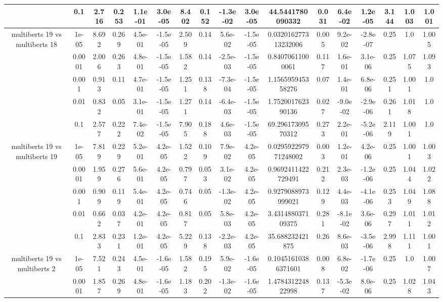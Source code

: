 \begin{tabular}{|c|c|c|c|c|c|c|c|c|c|c|c|c|c|c|c|c|}
 & 0.1 & 2.716 & 0.253 & 1.1e-01 & 3.0e-05 & 8.402 & 0.152 & -1.3e-02 & 3.0e-05 & 44.5441780090332 & 0.031 & 6.4e-02 & 1.2e-05 & 3.144 & 1.003 & 1.001 \\
\hline
\multirow{5}{*}{multiberts 19 vs multiberts 18} & 1e-05 & 8.692 & 0.269 & 4.5e-01 & -1.5e-05 & 2.509 & 0.14 & 5.6e-02 & -1.5e-05 & 0.032016277313232006 & 0.005 & 9.2e-02 & -2.8e-07 & 0.25 & 1.0 & 1.005 \\
 & 0.0001 & 2.006 & 0.263 & 4.8e-01 & -1.5e-05 & 1.582 & 0.14 & -2.5e-03 & -1.5e-05 & 0.84070611000061 & 0.117 & 1.6e-01 & 3.1e-06 & 0.25 & 1.075 & 1.093 \\
 & 0.001 & 0.913 & 0.11 & 4.7e-01 & -1.5e-05 & 1.251 & 0.138 & -7.3e-04 & -1.5e-05 & 1.156595945358276 & 0.07 & 1.4e-01 & 6.8e-06 & 0.251 & 1.001 & 1.0 \\
 & 0.01 & 0.832 & 0.05 & 3.1e-01 & -1.5e-05 & 1.271 & 0.14 & -6.4e-03 & -1.5e-05 & 1.752001762390136 & 0.027 & -9.0e-02 & -2.9e-06 & 0.261 & 1.018 & 1.0 \\
 & 0.1 & 2.577 & 0.222 & 7.4e-02 & -1.5e-05 & 7.905 & 0.188 & 4.6e-03 & -1.5e-05 & 69.29617309570312 & 0.273 & 2.2e-01 & -5.2e-06 & 2.119 & 1.001 & 1.0 \\
\hline
\multirow{5}{*}{multiberts 19 vs multiberts 19} & 1e-05 & 7.819 & 0.229 & 5.2e-01 & 4.2e-05 & 1.522 & 0.109 & 7.9e-02 & 4.2e-05 & 0.029592297971248002 & 0.003 & 1.2e-01 & 4.2e-06 & 0.25 & 1.001 & 1.003 \\
 & 0.0001 & 1.959 & 0.276 & 5.6e-01 & 4.2e-05 & 0.797 & 0.053 & 3.1e-02 & 4.2e-05 & 0.9692411422729491 & 0.212 & 2.3e-03 & -1.2e-06 & 0.25 & 1.044 & 1.022 \\
 & 0.001 & 0.909 & 0.119 & 5.4e-01 & 4.2e-05 & 0.746 & 0.05 & -1.3e-02 & 4.2e-05 & 0.9279088973999021 & 0.129 & 4.4e-03 & -4.1e-06 & 0.253 & 1.049 & 1.088 \\
 & 0.01 & 0.662 & 0.037 & 4.2e-01 & 4.2e-05 & 0.817 & 0.05 & 5.8e-03 & 4.2e-05 & 3.431488037109375 & 0.281 & -8.1e-02 & 3.6e-06 & 0.297 & 1.011 & 1.012 \\
 & 0.1 & 2.833 & 0.231 & 1.2e-01 & 4.2e-05 & 5.229 & 0.138 & -2.2e-03 & 4.2e-05 & 35.688232421875 & 0.26 & 8.6e-03 & -3.5e-06 & 2.998 & 1.111 & 1.001 \\
\hline
\multirow{5}{*}{multiberts 19 vs multiberts 2} & 1e-05 & 7.521 & 0.243 & 4.5e-01 & -1.6e-05 & 1.582 & 0.195 & 5.9e-02 & -1.6e-05 & 0.10451610386371601 & 0.008 & 6.8e-02 & -1.7e-06 & 0.25 & 1.0 & 1.007 \\
 & 0.0001 & 1.857 & 0.269 & 4.8e-01 & -1.6e-05 & 1.183 & 0.202 & -1.3e-02 & -1.6e-05 & 1.478431224822998 & 0.137 & -5.3e-02 & 8.0e-06 & 0.25 & 1.028 & 1.043 \\

\end{tabular}
